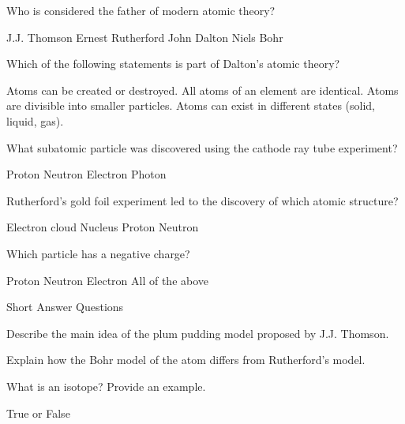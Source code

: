 \documentclass{exam}
\begin{document}
\begin{questions}
    
\question[2] Who is considered the father of modern atomic theory?
\begin{checkboxes}
    \choice J.J. Thomson 
    \choice Ernest Rutherford
    \choice John Dalton 
    \choice Niels Bohr 
\end{checkboxes}


\question[2] Which of the following statements is part of Dalton's atomic theory?
\begin{checkboxes}
    \choice Atoms can be created or destroyed.  
    \choice All atoms of an element are identical.  
    \choice Atoms are divisible into smaller particles.  
    \choice Atoms can exist in different states (solid, liquid, gas). 
\end{checkboxes}



\question[2] What subatomic particle was discovered using the cathode ray tube experiment?
\begin{checkboxes}
    \choice Proton  
    \choice Neutron  
    \choice Electron  
    \choice Photon 
\end{checkboxes}

\question[2] Rutherford's gold foil experiment led to the discovery of which atomic structure?  
\begin{checkboxes}
    \choice Electron cloud  
    \choice Nucleus  
    \choice Proton  
    \choice Neutron  
\end{checkboxes}

\question[2] Which particle has a negative charge?
\begin{checkboxes}
    \choice Proton  
    \choice Neutron  
    \choice Electron  
    \choice All of the above  
\end{checkboxes}  



Short Answer Questions

\question[5] Describe the main idea of the plum pudding model proposed by J.J. Thomson.  

\makeemptybox{1in}

\question[5] Explain how the Bohr model of the atom differs from Rutherford's model.  

\makeemptybox{1in}

\question[5] What is an isotope? Provide an example.  

\makeemptybox{1in}


True or False


\end{questions}
\end{document}

